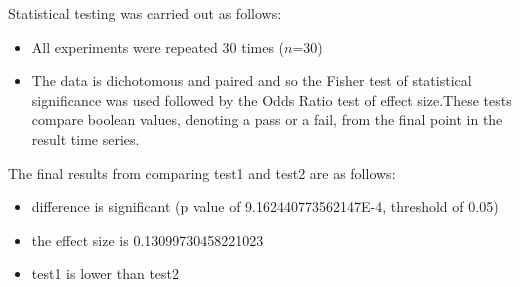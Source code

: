 \documentclass[]{article}
\begin{document}
Statistical testing was carried out as follows: 
\begin{itemize}
\item{All experiments were repeated 30 times ($n$=30)}
\item{The data is dichotomous and paired and so the Fisher test of statistical significance was used followed by the Odds Ratio test of effect size.These tests compare boolean values, denoting a pass or a fail, from the final point in the result time series. }
\end{itemize}
The final results from comparing test1 and test2 are as follows:
\begin{itemize}
\item{difference is significant (p value of 9.162440773562147E-4, threshold of 0.05)}
\item{the effect size is 0.13099730458221023}
\item{test1 is lower than test2}
\end{itemize}
\end{document}
